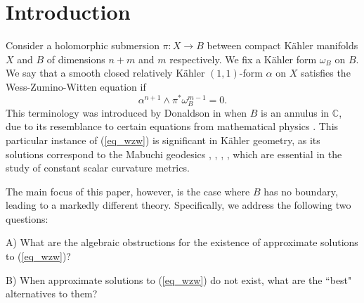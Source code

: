 \documentclass[12pt]{article}
\numberwithin{equation}{section}
\theoremstyle{theorem}
\theoremstyle{definition}
\theoremstyle{remark}
\begin{document}
\vspace*{-1.5cm}

\tableofcontents

\vspace*{-0.2cm}

\noindent \hrulefill




\section{Introduction}\label{sect_intro}
	Consider a holomorphic submersion $\pi : X \to B$ between compact Kähler manifolds $X$ and $B$ of dimensions $n + m$ and $m$ respectively.
	We fix a Kähler form $\omega_B$ on $B$.
	We say that a smooth closed relatively Kähler $(1, 1)$-form $\alpha$ on $X$ satisfies the Wess-Zumino-Witten equation if
	\begin{equation}\label{eq_wzw}
		\alpha^{n + 1} \wedge \pi^* \omega_B^{m - 1} = 0.
	\end{equation}
	This terminology was introduced by Donaldson in \cite{DonaldSymSp} when $B$ is an annulus in $\mathbb{C}$, due to its resemblance to certain equations from mathematical physics \cite{WittenWZW}. 
	This particular instance of (\ref{eq_wzw}) is significant in Kähler geometry, as its solutions correspond to the Mabuchi geodesics \cite{Mabuchi}, \cite{Semmes}, \cite{DonaldSymSp}, \cite{ChenGeodMab}, which are essential in the study of constant scalar curvature metrics.
	\par 
	The main focus of this paper, however, is the case where $B$ has no boundary, leading to a markedly different theory. 
	Specifically, we address the following two questions:
	\par 
	\vspace*{0.3cm}
	\noindent
	A)
	What are the algebraic obstructions for the existence of approximate solutions to (\ref{eq_wzw})?
	\vspace*{0.3cm}
	\par 
	\noindent
	B)
	When approximate solutions to (\ref{eq_wzw}) do not exist, what are the “best" alternatives to them?
	\vspace*{0.3cm}
	\par 
\end{document}
